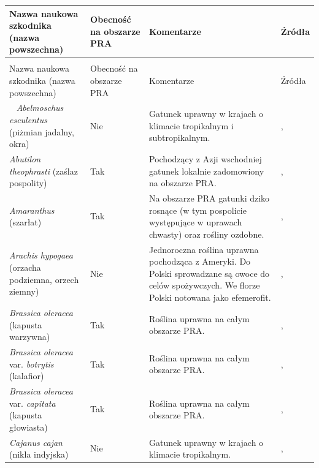 \documentclass[polish,a4paper]{article}
\begin{document}
\begin{longtabu} to 
\toprule
{}  \textbf{Nazwa naukowa szkodnika (nazwa powszechna)} & \textbf{Obecność na obszarze PRA} & \textbf{Komentarze} & \textbf{Źródła}\\
\midrule
\endfirsthead
{}\\
\toprule
Nazwa naukowa szkodnika (nazwa powszechna) & Obecność na obszarze PRA & Komentarze & Źródła\\
\midrule
\endhead
\
\endfoot
\bottomrule
\endlastfoot
\textit{Abelmoschus esculentus} (piżmian jadalny, okra) & Nie & Gatunek uprawny w krajach o klimacie tropikalnym i subtropikalnym. & \citeauthor{cabi2017}, \hyperlink{ref-cabi2017}{\citeyear{cabi2017}}\\
\textit{Abutilon theophrasti} (zaślaz pospolity) & Tak & Pochodzący z Azji wschodniej gatunek lokalnie zadomowiony na obszarze PRA. & \citeauthor{cabi2017}, \hyperlink{ref-cabi2017}{\citeyear{cabi2017}}\\
\textit{Amaranthus} (szarłat) & Tak & Na obszarze PRA gatunki dziko rosnące (w tym pospolicie występujące w uprawach chwasty) oraz rośliny ozdobne. & \citeauthor{cabi2017}, \hyperlink{ref-cabi2017}{\citeyear{cabi2017}}\\
\textit{Arachis hypogaea} (orzacha podziemna, orzech ziemny) & Nie & Jednoroczna roślina uprawna pochodząca z Ameryki. Do Polski sprowadzane są owoce do celów spożywczych. We florze Polski notowana jako efemerofit. & \citeauthor{cabi2017}, \hyperlink{ref-cabi2017}{\citeyear{cabi2017}}\\
\textit{Brassica oleracea} (kapusta warzywna) & Tak & Roślina uprawna na całym obszarze PRA. & \citeauthor{cabi2017}, \hyperlink{ref-cabi2017}{\citeyear{cabi2017}}\\
\addlinespace
\textit{Brassica oleracea} var. \textit{botrytis} (kalafior) & Tak & Roślina uprawna na całym obszarze PRA. & \citeauthor{cabi2017}, \hyperlink{ref-cabi2017}{\citeyear{cabi2017}}\\
\textit{Brassica oleracea} var. \textit{capitata} (kapusta głowiasta) & Tak & Roślina uprawna na całym obszarze PRA. & \citeauthor{cabi2017}, \hyperlink{ref-cabi2017}{\citeyear{cabi2017}}\\
\textit{Cajanus cajan} (nikla indyjska) & Nie & Gatunek uprawny w krajach o klimacie tropikalnym. & \citeauthor{cabi2017}, \hyperlink{ref-cabi2017}{\citeyear{cabi2017}}\\

\end{longtabu}
\end{document}
